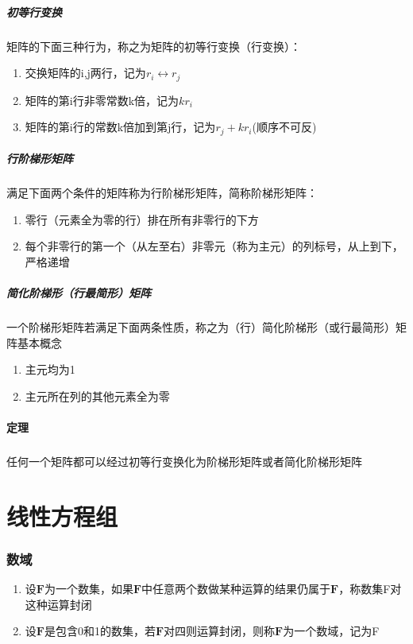 \documentclass[UTF-8,a4paper]{ctexart}
\begin{document}
\subsubsection{初等行变换}
\kaishu 矩阵的下面三种行为，称之为矩阵的初等行变换（行变换）：
\begin{enumerate}
    \item 交换矩阵的i,j两行，记为\(r_i \leftrightarrow r_j \)
    \item 矩阵的第i行非零常数k倍，记为\(kr_i\)
    \item 矩阵的第i行的常数k倍加到第j行，记为\(r_j+kr_i\)(顺序不可反)
\end{enumerate}

\subsubsection{行阶梯形矩阵}
满足下面两个条件的矩阵称为行阶梯形矩阵，简称阶梯形矩阵：
\begin{enumerate}
    \item 零行（元素全为零的行）排在所有非零行的下方
    \item 每个非零行的第一个（从左至右）非零元（称为主元）的列标号，从上到下，严格递增
\end{enumerate}

\subsubsection{简化阶梯形（行最简形）矩阵}
一个阶梯形矩阵若满足下面两条性质，称之为（行）简化阶梯形（或行最简形）矩阵基本概念
\begin{enumerate}
    \item 主元均为1
    \item 主元所在列的其他元素全为零
\end{enumerate}

\subsection{定理}
\subsubsection{} 任何一个矩阵都可以经过初等行变换化为阶梯形矩阵或者简化阶梯形矩阵




\part{线性方程组}
\section{数域}
\begin{enumerate}
    \item 设\(\mathbf{F}\)为一个数集，如果\(\mathbf{F}\)中任意两个数做某种运算的结果仍属于\(\mathbf{F}\)，称数集F对这种运算封闭
    \item 设\(\mathbf{F}\)是包含0和1的数集，若\(\mathbf{F}\)对四则运算封闭，则称\(\mathbf{F}\)为一个数域，记为F
\end{enumerate}
\end{document}
